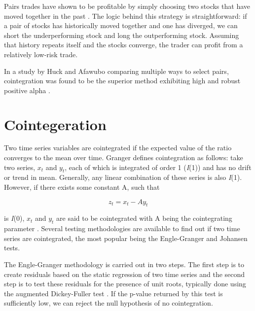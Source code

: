 \documentclass{UoYCSproject}
\begin{document}
Pairs trades have shown to be profitable by simply choosing two stocks that have moved together in the past \parencite{pairshistory}. The logic behind this strategy is straightforward: if a pair of stocks has historically moved together and one has diverged, we can short the underperforming stock and long the outperforming stock. Assuming that history repeats itself and the stocks converge, the trader can profit from a relatively low-risk trade.

In a study by Huck and Afawubo comparing multiple ways to select pairs, cointegration was found to be the superior method exhibiting high and robust positive alpha \parencite{cointsupport}.

\section{Cointegeration}

Two time series variables are cointegrated if the expected value of the ratio converges to the mean over time. Granger defines cointegration as follows: take two series, $x_{t}$ and $y_{t}$, each of which is integrated of order 1 (\emph{I}(1)) and has no drift or trend in mean. Generally, any linear combination of these series is also \emph{I}(1). However, if there exists some constant A, such that

\[z_t = x_t - Ay_t\]

is \emph{I}(0), $x_t$ and $y_t$ are said to be cointegrated with A being the cointegrating parameter \parencite{cointdef}. Several testing methodologies are available to find out if two time series are cointegrated, the most popular being the Engle-Granger and Johansen tests.

The Engle-Granger methodology is carried out in two steps. The first step is to create residuals based on the static regression of two time series and the second step is to test these residuals for the presence of unit roots, typically done using the augmented Dickey-Fuller test \parencite{englegranger} \parencite{adf}. If the p-value returned by this test is sufficiently low, we can reject the null hypothesis of no cointegration.
\end{document}
